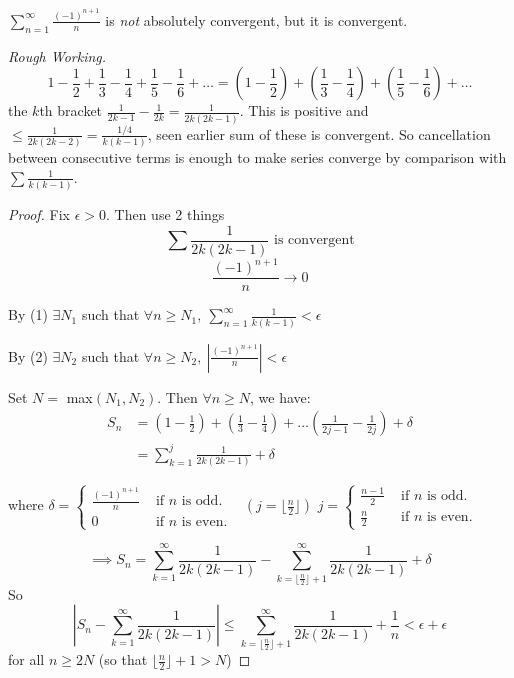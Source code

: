 \documentclass[10pt,twoside]{scrartcl}
\begin{document}
\begin{example}
$\sum_{n=1}^{\infty} \frac{(-1)^{n+1}}{n}$ is \emph{not} absolutely convergent, but it is convergent.


\textit{Rough Working.} \[\textstyle{1 - \frac{1}{2} + \frac{1}{3} - \frac{1}{4} + \frac{1}{5} - \frac{1}{6} + \dots = (1-\frac{1}{2}) + (\frac{1}{3} - \frac{1}{4}) + (\frac{1}{5} -\frac{1}{6}) + \dots}\]the $k$th bracket $\frac{1}{2k-1} - \frac{1}{2k} = \frac{1}{2k(2k-1)}$. This is positive and $\leq \frac{1}{2k(2k-2)} = \frac{1/4}{k(k-1)}$, seen earlier sum of these is convergent. So cancellation between consecutive terms is enough to make series converge by comparison with $\sum \frac{1}{k(k-1)}$.

\begin{proof}
Fix $\epsilon >0.$ Then use 2 things
 \[\sum \frac{1}{2k(2k-1)}\text{	is convergent}\tag{1}\]
\[\frac{(-1)^{n+1}}{n}\to 0\tag{2}\]

By (1) $\exists N_1$ such that $\forall n \geq N_1,~ \sum_{n=1}^{\infty} \frac{1}{k(k-1)} < \epsilon$

By (2) $\exists N_2$ such that $\forall n \geq N_2,~ \left|\frac{(-1)^{n+1}}{n}\right| < \epsilon$

Set $N =$ max$(N_1,N_2)$. Then $\forall n \geq N$, we have:
\begin{align*}S_n &= \left(1-\frac{1}{2}\right) + \left(\frac{1}{3} - \frac{1}{4}\right) + \dots \left(\frac{1}{2j-1} - \frac{1}{2j} \right) + \delta\\
&= \sum_{k=1}^{j} \frac{1}{2k(2k-1)} + \delta	
\end{align*}

where $\delta = \begin{cases}
 	\frac{(-1)^{n+1}}{n} & \text{ if } n \text{ is odd.}\\
 	0 & \text{ if } n \text{ is even.}
 \end{cases}
$ $~~\left(j = \lfloor \frac{n}{2} \rfloor\right)$   $j = \begin{cases}
 	\frac{n-1}{2} & \text{ if } n \text{ is odd.}\\
 	\frac{n}{2} & \text{ if } n \text{ is even.}
 \end{cases}
$

\[\implies S_n = \sum_{k=1}^{\infty} \frac{1}{2k(2k-1)} - \sum_{k=\lfloor \frac{n}{2} \rfloor + 1}^{\infty} \frac{1}{2k(2k-1)} + \delta\]
So
\[ \left|S_n - \sum_{k=1}^{\infty} \frac{1}{2k(2k-1)} \right| \leq \sum_{k=\lfloor \frac{n}{2} \rfloor + 1}^{\infty} \frac{1}{2k(2k-1)} + \frac{1}{n} < \epsilon + \epsilon\] for all $n \geq 2N$ (so that $\lfloor \frac{n}{2} \rfloor + 1 >N$) 
\end{proof}
\end{example}\vspace*{10pt}
\end{document}
